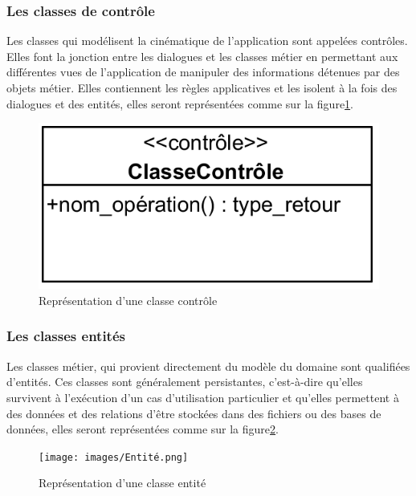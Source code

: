         \subsubsection{Les classes de contrôle}
        Les classes qui modélisent la cinématique de l’application sont appelées contrôles. Elles font la jonction entre les dialogues et les classes métier en permettant aux différentes vues de l’application de manipuler des informations détenues par des objets métier. Elles contiennent les règles applicatives et les isolent à la fois des dialogues et des entités, elles seront représentées comme sur la figure\ref{fig21}.
            \begin{figure}[h!]
                 \centering
                \includegraphics[scale=1.5]{images/Controle.png}
                 \caption{Représentation d'une classe contrôle}
                 \label{fig21}
            \end{figure}
        
        \subsubsection{Les classes entités}
        Les classes métier, qui provient directement du modèle du domaine sont qualifiées d’entités. Ces classes sont généralement persistantes, c’est-à-dire qu’elles survivent à l’exécution d’un cas d’utilisation particulier et qu’elles permettent à des données et des relations d’être stockées dans des fichiers ou des bases de données, elles seront représentées comme sur la figure\ref{fig22}.
        \clearpage
            \begin{figure}[h!]
                 \centering
                \texttt{[image: images/Entité.png]}
                 \caption{Représentation d'une classe entité}
                 \label{fig22}
            \end{figure}
        

